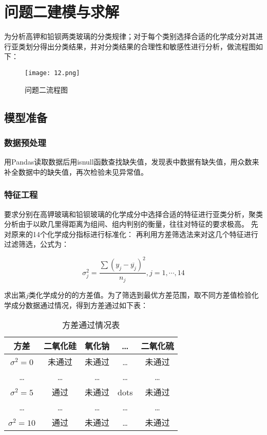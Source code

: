 \section{问题二建模与求解}

为分析高钾和铅钡两类玻璃的分类规律；对于每个类别选择合适的化学成分对其进行亚类划分得出分类结果，并对分类结果的合理性和敏感性进行分析，做流程图如下： 

\begin{figure}[H] 
	\centering %
	\texttt{[image: 12.png]} %
	\caption{问题二流程图} %
	\label{Fig.main13} %
\end{figure}

\subsection{模型准备}

\subsubsection{数据预处理}

用Pandas读取数据后用isnull函数查找缺失值，发现表中数据有缺失值，用众数来补全数据中的缺失值，再次检验未见异常值。

\subsubsection{特征工程}

要求分别在高钾玻璃和铅钡玻璃的化学成分中选择合适的特征进行亚类分析，聚类分析由于以欧几里得距离为组间、组内判别的衡量，往往对特征的要求极高。
先对原来的14个化学成分指标进行标准化：
再利用方差筛选法来对这几个特征进行过滤筛选，公式为：

\begin{equation}
    \sigma_{j}^{2}=\frac{\sum{{{({{y}_{j}}-\overline{{{y}_{j}}})}^{2}}}}{{{n}_{j}}},j=1,\cdots ,14
\end{equation}

求出第$j$类化学成分的的方差值。为了筛选到最优方差范围，取不同方差值检验化学成分数据通过情况，得到方差通过如下表：

\begin{table}[H]
	\centering
	\begin{tabular}{c c c c c} 
		\toprule[1.5pt]
		方差 & 二氧化硅 & 氧化钠 & \dots & 二氧化硫 \\
		\midrule[1pt]
		$\sigma^2=0$ & 未通过 & 未通过 & \dots & 未通过 \\
		\dots & \dots & \dots & \dots & \dots \\
		$\sigma^2=5$ & 通过 & 未通过 & dots & 未通过 \\
		\dots & \dots & \dots & \dots & \dots \\
		$\sigma^2=10$ & 通过 & 未通过 & \dots & 未通过 \\
		\toprule[1.5pt]
	\end{tabular}
\caption{方差通过情况表}
\end{table}


